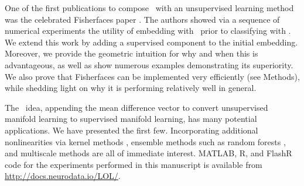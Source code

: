 \documentclass[10pt]{article}
\begin{document}
%
One of the first publications to compose \Fld~with an unsupervised learning method was the celebrated Fisherfaces paper \cite{Belhumeur1997a}.  The authors showed via a sequence of numerical experiments the utility of embedding with \Pca~prior to classifying with \Fld.  We extend this work by adding a supervised component to the initial embedding.  Moreover, we provide the geometric intuition for why and when this is advantageous, as well as show numerous examples demonstrating its superiority.  %
We also prove that Fisherfaces can be implemented very efficiently (see Methods), while shedding light on why it is performing relatively well in general.





%
The \Lol~idea, appending the mean difference vector to convert unsupervised manifold learning to supervised manifold learning, has many potential applications.  We have presented the first few.  Incorporating additional nonlinearities via kernel methods \cite{Mika1999a}, ensemble methods such as random forests \cite{Breiman2001a}, and multiscale methods \cite{Allard2012}
are all of immediate interest. MATLAB, R, and FlashR code for the experiments performed in this manuscript is available from \url{http://docs.neurodata.io/LOL/}.
\end{document}
